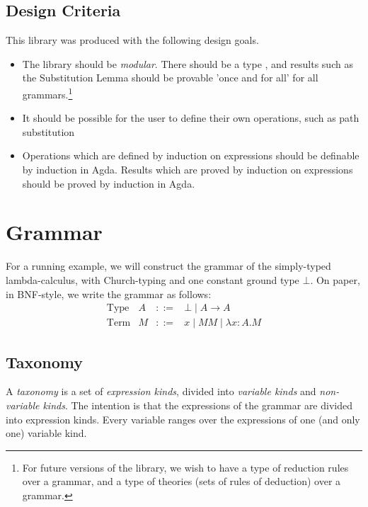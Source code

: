 \documentclass[envcountsame]{llncs}
\begin{document}
\subsection{Design Criteria}

This library was produced with the following design goals.

\begin{itemize}
\item
The library should be \emph{modular}.  There should be a type , and results such as the Substitution Lemma 
should be
provable 'once and for all' for all grammars.\footnote{For future versions of the library, we wish to have a type of reduction rules over a grammar, and a type of theories (sets of rules of deduction) over a grammar.}
\item
It should be possible for the user to define their own operations, such as path substitution %
\item
Operations which are defined by induction on expressions should be definable by induction in Agda.  Results which are proved by induction on expressions should be proved by induction in Agda.
\end{itemize}

\section{Grammar}

\begin{example}
\label{ex:stlc}
For a running example, we will construct the grammar of the simply-typed lambda-calculus, with Church-typing and one constant ground type $\bot$.  On paper, in BNF-style, we write the grammar as follows:
\[ \begin{array}{lrcl}
\text{Type} & A & ::= & \bot \mid A \rightarrow A \\
\text{Term} & M & ::= & x \mid MM \mid \lambda x : A . M
\end{array} \]
\end{example}

\subsection{Taxonomy}

A \emph{taxonomy} is a set of \emph{expression kinds}, divided into \emph{variable kinds} and \emph{non-variable kinds}.
The intention is that the expressions of the grammar are divided into expression kinds.  Every
variable ranges over the expressions of one (and only one) variable kind.
\end{document}
